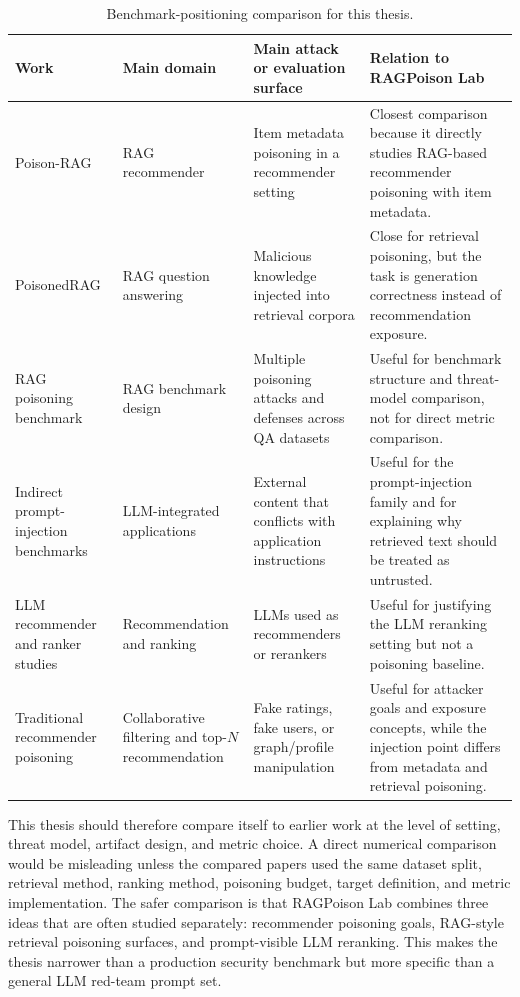 \begin{table}[H]
\centering
\small
\caption{Benchmark-positioning comparison for this thesis.}
\label{tab:benchmark-positioning-comparison}
\begin{tabular}{p{}p{}p{}p{}}
\toprule
Work & Main domain & Main attack or evaluation surface & Relation to RAGPoison Lab \\
\midrule
Poison-RAG & RAG recommender & Item metadata poisoning in a recommender setting & Closest comparison because it directly studies RAG-based recommender poisoning with item metadata. \\
PoisonedRAG & RAG question answering & Malicious knowledge injected into retrieval corpora & Close for retrieval poisoning, but the task is generation correctness instead of recommendation exposure. \\
RAG poisoning benchmark & RAG benchmark design & Multiple poisoning attacks and defenses across QA datasets & Useful for benchmark structure and threat-model comparison, not for direct metric comparison. \\
Indirect prompt-injection benchmarks & LLM-integrated applications & External content that conflicts with application instructions & Useful for the prompt-injection family and for explaining why retrieved text should be treated as untrusted. \\
LLM recommender and ranker studies & Recommendation and ranking & LLMs used as recommenders or rerankers & Useful for justifying the LLM reranking setting but not a poisoning baseline. \\
Traditional recommender poisoning & Collaborative filtering and top-$N$ recommendation & Fake ratings, fake users, or graph/profile manipulation & Useful for attacker goals and exposure concepts, while the injection point differs from metadata and retrieval poisoning. \\
\bottomrule
\end{tabular}
\end{table}

This thesis should therefore compare itself to earlier work at the level of setting, threat model, artifact design, and metric choice. A direct numerical comparison would be misleading unless the compared papers used the same dataset split, retrieval method, ranking method, poisoning budget, target definition, and metric implementation. The safer comparison is that RAGPoison Lab combines three ideas that are often studied separately: recommender poisoning goals, RAG-style retrieval poisoning surfaces, and prompt-visible LLM reranking. This makes the thesis narrower than a production security benchmark but more specific than a general LLM red-team prompt set.
